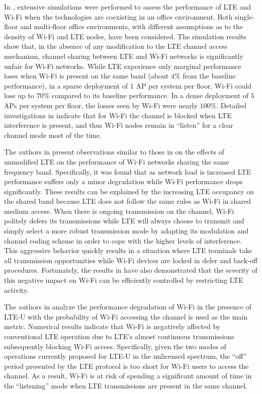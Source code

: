 In \cite{original-LTE-Wi-Fi-VTC-2013}, extensive simulations were performed to assess the performance of LTE and Wi-Fi when the technologies are coexisting in an office environment. Both single-floor and multi-floor office environments, with different assumptions as to the density of Wi-Fi and LTE nodes, have been considered. The simulation results show that, in the absence of any modification to the LTE channel access mechanism, channel sharing between LTE and Wi-Fi networks is significantly unfair for Wi-Fi networks. While LTE experience only marginal performance loses when Wi-Fi is present on the same band (about $4$\% from the baseline performance), in a sparse deployment of $1$ AP per system per floor, Wi-Fi could lose up to $70$\% compared to its baseline performance.  In a dense deployment of $5$ APs per system per floor, the losses seen by Wi-Fi were nearly $100$\%. Detailed investigations in \cite{original-LTE-Wi-Fi-VTC-2013} indicate that for Wi-Fi the channel is blocked when LTE interference is present, and thus Wi-Fi nodes remain in ``listen'' for a clear channel mode most of the time.

The authors in \cite{original-LTE-Wi-Fi-WCNC-2013} present observations similar to those in \cite{original-LTE-Wi-Fi-VTC-2013} on the effects of unmodified LTE on the performance of Wi-Fi networks sharing the same frequency band. Specifically, it was found that as network load is increased LTE performance suffers only a minor degradation while Wi-Fi performance drops significantly. These results can be explained by the increasing LTE occupancy on the shared band because LTE does not follow the same rules as Wi-Fi in shared medium access. When there is ongoing transmission on the channel, Wi-Fi politely defers its transmissions while LTE will always choose to transmit and simply select a more robust transmission mode by adapting its modulation and channel coding scheme in order to cope with the higher levels of interference. This aggressive behavior quickly results in a situation where LTE terminals take all transmission opportunities while Wi-Fi devices are locked in defer and back-off procedures. Fortunately, the results in \cite{original-LTE-Wi-Fi-WCNC-2013} have also demonstrated that the severity of this negative impact on Wi-Fi can be efficiently controlled by restricting LTE activity.

The authors in \cite{LTE-U-PIMRC-2014} analyze the performance degradation of Wi-Fi in the presence of LTE-U with the probability of Wi-Fi accessing the channel is used as the main metric. Numerical results indicate that Wi-Fi is negatively affected by conventional LTE operation due to LTE's almost continuous transmissions subsequently blocking Wi-Fi access. Specifically, given the two modes of operations currently proposed for LTE-U in the unlicensed spectrum, the ``off'' period presented by the LTE protocol is too short for Wi-Fi users to access the channel. As a result, Wi-Fi is at risk of spending a significant amount of time in the ``listening'' mode when LTE transmissions are present in the same channel.

